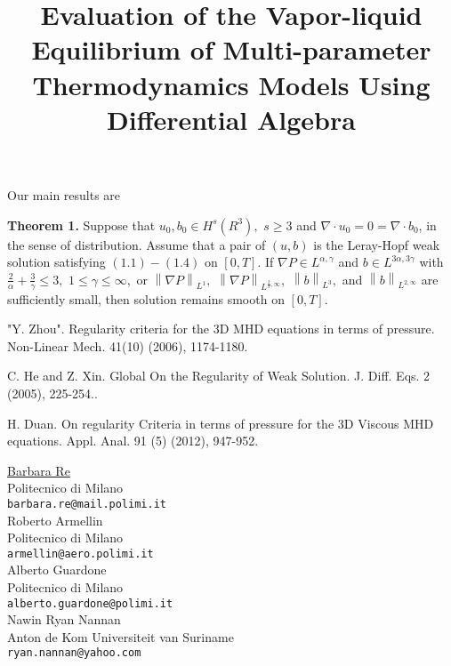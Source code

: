 \documentclass[article,A4,11pt]{llncs}%
\begin{document}
Our main results are

\textbf{Theorem 1.} Suppose  that $u_{0},b_{0}\in H^{s}(R^{3}),$ $s\geq 3$ and $\nabla \cdot u_{0}=0=\nabla \cdot b_{0}$, in the sense of distribution. Assume that a pair of $(u,b)$ is the Leray-Hopf weak solution satisfying $(1.1)-(1.4)$ on $[0,T].$ If $ \nabla P\in L^{\alpha, \gamma}$ and $b\in L^{3\alpha, 3\gamma}$ with $\frac {2} {\alpha}+\frac {3}{\gamma}\leq 3,$
$1\leq \gamma\leq\infty,$ or $\left\|\nabla P\right\|_{L^ {1}},$ $\left\|\nabla P\right\|_{L^ {\frac{2}{3},\infty}},$ $\left\|b\right\|_{L^ {3}},$ and $\left\|b\right\|_{L^ {2,\infty}}$ are sufficiently small, then solution remains smooth on $[0,T].$



\begin{thebibliography}{10}
{\sc "Y. Zhou"}. { Regularity criteria for the 3D MHD equations in terms of pressure}. Non-Linear Mech. 41(10) (2006), 1174-1180.

{\sc C. He and Z. Xin}. {Global On the Regularity of Weak Solution}. J. Diff. Eqs. 2 (2005), 225-254..

{\sc H. Duan}. {On regularity Criteria in terms of pressure for the 3D Viscous MHD equations}. Appl. Anal. 91 (5) (2012), 947-952.
\end{thebibliography}

\title{Evaluation of the Vapor-liquid Equilibrium of Multi-parameter Thermodynamics Models Using Differential Algebra}
 \author{} \institute{}
\maketitle
\begin{center}
{\large \underline{Barbara Re}}\\
Politecnico di Milano\\
{\tt barbara.re@mail.polimi.it}
\\ \vspace{4mm}
{\large Roberto Armellin}\\
Politecnico di Milano\\
{\tt armellin@aero.polimi.it}
\\ \vspace{4mm}
{\large Alberto Guardone}\\
Politecnico di Milano\\
{\tt alberto.guardone@polimi.it}
\\ \vspace{4mm}
{\large Nawin Ryan Nannan}\\
Anton de Kom Universiteit van Suriname\\
{\tt ryan.nannan@yahoo.com}
\end{center}
\end{document}
